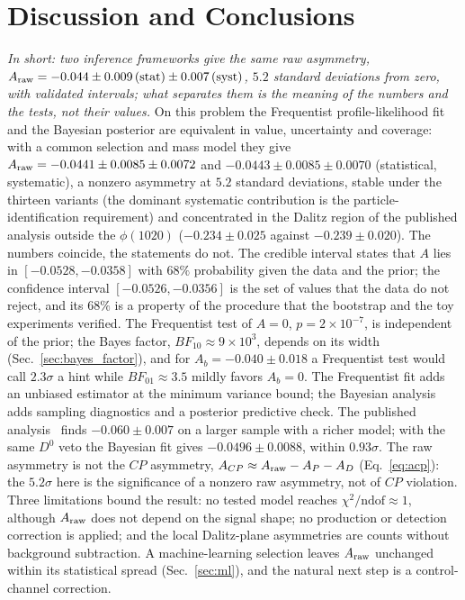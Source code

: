 \section{Discussion and Conclusions}
\label{sec:conclusions}
\label{app:conclusions}
\emph{In short: two inference frameworks give the same raw asymmetry, $A_{\mathrm{raw}}=-0.044\pm0.009\,(\text{stat})\pm0.007\,(\text{syst})$, $5.2$ standard deviations from zero, with validated intervals; what separates them is the meaning of the numbers and the tests, not their values.}
On this problem the Frequentist profile-likelihood fit and the Bayesian posterior are equivalent in value, uncertainty and coverage: with a common selection and mass model they give $A_{\mathrm{raw}}=-0.0441\pm0.0085\pm0.0072$ and $-0.0443\pm0.0085\pm0.0070$ (statistical, systematic), a nonzero asymmetry at $5.2$ standard deviations, stable under the thirteen variants (the dominant systematic contribution is the particle-identification requirement) and concentrated in the Dalitz region of the published analysis outside the $\phi(1020)$ ($-0.234\pm0.025$ against $-0.239\pm0.020$).
The numbers coincide, the statements do not. The credible interval states that $A$ lies in $[-0.0528,-0.0358]$ with $68\%$ probability given the data and the prior; the confidence interval $[-0.0526,-0.0356]$ is the set of values that the data do not reject, and its $68\%$ is a property of the procedure that the bootstrap and the toy experiments verified. The Frequentist test of $A=0$, $p=2\times10^{-7}$, is independent of the prior; the Bayes factor, $BF_{10}\approx9\times10^3$, depends on its width (Sec.~\ref{sec:bayes_factor}), and for $A_b=-0.040\pm0.018$ a Frequentist test would call $2.3\sigma$ a hint while $BF_{01}\approx3.5$ mildly favors $A_b=0$. The Frequentist fit adds an unbiased estimator at the minimum variance bound; the Bayesian analysis adds sampling diagnostics and a posterior predictive check.
The published analysis~\cite{lhcb_cpv_2013} finds $-0.060\pm0.007$ on a larger sample with a richer model; with the same $D^0$ veto the Bayesian fit gives $-0.0496\pm0.0088$, within $0.93\sigma$. The raw asymmetry is not the $CP$ asymmetry, $A_{CP}\approx A_{\mathrm{raw}}-A_P-A_D$ (Eq.~\eqref{eq:acp}): the $5.2\sigma$ here is the significance of a nonzero raw asymmetry, not of $CP$ violation. Three limitations bound the result: no tested model reaches $\chi^2/\mathrm{ndof}\approx1$, although $A_{\mathrm{raw}}$ does not depend on the signal shape; no production or detection correction is applied; and the local Dalitz-plane asymmetries are counts without background subtraction. A machine-learning selection leaves $A_{\mathrm{raw}}$ unchanged within its statistical spread (Sec.~\ref{sec:ml}), and the natural next step is a control-channel correction.
